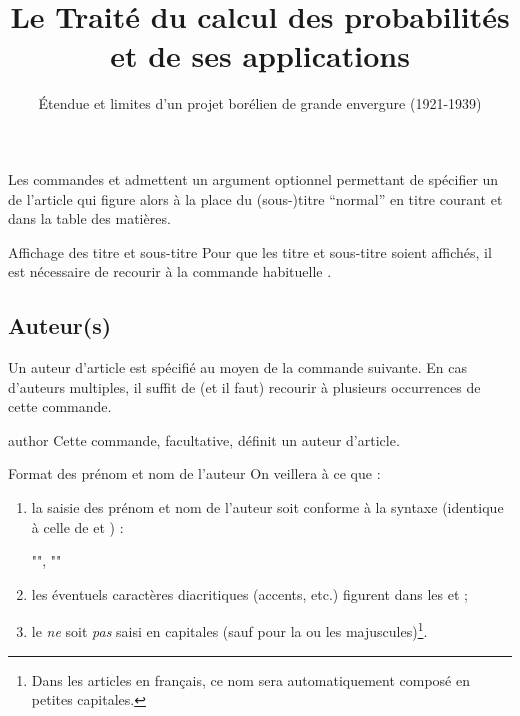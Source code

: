 \documentclass[french,nolocaltoc]{nwejmart}
\newtheorem[title=Fait,style=definition]{fact}
\begin{document}
Les commandes  et  admettent un argument
optionnel permettant de spécifier un  de l'article qui
figure alors à la place du (sous-)titre \enquote{normal} en titre courant et
dans la table des matières.

\begin{bodycode}[listing options={deletekeywords={title,subtitle}}]
\title[Le Traité du calcul des probabilités]{Le Traité du calcul des
  probabilités et de ses applications}
\subtitle[Étendue et limites d'un projet borélien]{Étendue et limites
  d'un projet borélien de grande envergure (1921-1939)}
\end{bodycode}

\begin{dbremark}{Affichage des titre et sous-titre}{}
  Pour que les titre et sous-titre soient affichés, il est nécessaire de
  recourir à la commande habituelle .
\end{dbremark}

\subsection{Auteur(s)}
\label{sec-auteurs}

Un auteur d'article est spécifié au moyen de la commande 
suivante. En cas d'auteurs multiples, il suffit de (et il faut) recourir
à plusieurs occurrences de cette commande.

\begin{docCommand}{author}{}
  Cette commande, facultative, définit un auteur d'article.
\end{docCommand}
%
\begin{dbwarning}{Format des prénom et nom de l'auteur}{}
  On veillera à ce que :
  \begin{enumerate}
  \item la saisie des prénom et nom de l'auteur soit conforme à la syntaxe
    (identique à celle de  et ) :
\begin{bodycode}[listing options={showspaces}]
"", ""
\end{bodycode}
  \item les éventuels caractères diacritiques (accents, etc.) figurent dans les
     et  ;
  \item le  \emph{ne} soit \emph{pas} saisi en capitales (sauf pour la
    ou les majuscules)\footnote{Dans les articles en français, ce nom sera
      automatiquement composé en petites capitales.}.
  \end{enumerate}
\end{dbwarning}
\end{document}
